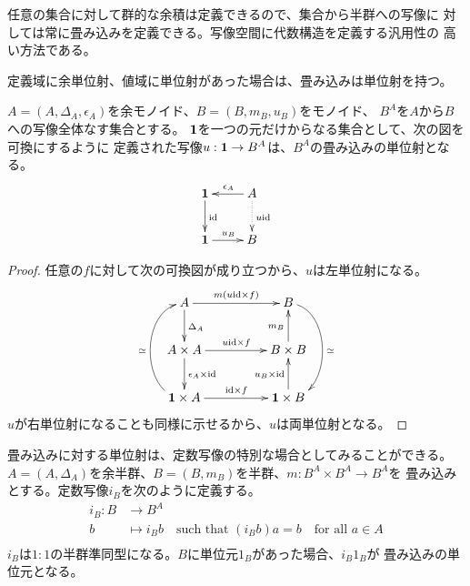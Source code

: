 		任意の集合に対して群的な余積は定義できるので、集合から半群への写像に
		対しては常に畳み込みを定義できる。写像空間に代数構造を定義する汎用性の
		高い方法である。
		
		定義域に余単位射、値域に単位射があった場合は、畳み込みは単位射を持つ。

		\begin{proposition}[畳み込みの単位射]\label{prop:畳み込みの単位射} %
			$A=(A,\Delta_A,\epsilon_A)$を余モノイド、$B=(B,m_B,u_B)$をモノイド、
			$B^A$を$A$から$B$への写像全体なす集合とする。
			${\mathbf{1}}$を一つの元だけからなる集合として、次の図を可換にするように
			定義された写像$u:{\mathbf{1}}\to B^A$は、$B^A$の畳み込みの単位射となる。
			\begin{equation}\xymatrix{
				\mybf{1} \ar[d]^{\myid} & A \ar[l]_{\epsilon_A} \ar@{.>}[d]^{u\myid} \\
				\mybf{1} \ar[r]^{u_B} & B \\
			}\end{equation}
		\end{proposition} %
		\begin{proof} %
			任意の$f$に対して次の可換図が成り立つから、$u$は左単位射になる。
			\begin{equation}\xymatrix@C+2pc{
				A \ar[d]^{\Delta_A} \ar[r]^{m(u\myid\times f)} & B \ar@(r,r)[dd]^{\simeq} \\
				A\times A \ar[d]^{\epsilon_A\times \myid} \ar[r]^{u\myid\times f} & B\times B \ar[u]^{m_B} \\
				\mybf{1}\times A \ar[r]^{\myid\times f} \ar@(l,l)[uu]^{\simeq} & \mybf{1}\times B \ar[u]^{u_B\times \myid} \\
			}\end{equation}
			$u$が右単位射になることも同様に示せるから、$u$は両単位射となる。
		\end{proof} %
		
		畳み込みに対する単位射は、定数写像の特別な場合としてみることができる。
		$A=(A,\Delta_A)$を余半群、$B=(B,m_B)$を半群、$m:B^A\times B^A\to B^A$を
		畳み込みとする。定数写像$i_B$を次のように定義する。
		\begin{equation}\label{eq:定数写像}\begin{split} %
			i_B: B&\to B^A \\
				b&\mapsto i_Bb \quad\text{such that }(i_Bb)a = b \quad\text{for all }a\in A \\
		\end{split}\end{equation} %
		$i_B$は$1:1$の半群準同型になる。$B$に単位元$1_B$があった場合、$i_B1_B$が
		畳み込みの単位元となる。

